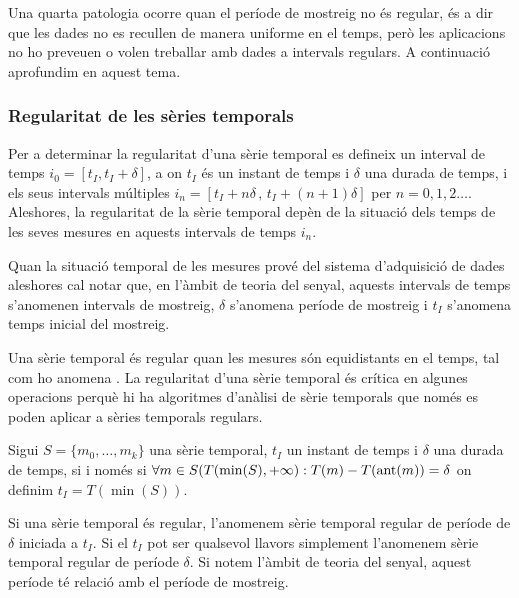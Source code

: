 Una quarta patologia ocorre quan el període de mostreig no és regular,
és a dir que les dades no es recullen de manera uniforme en el temps,
però les aplicacions no ho preveuen o volen treballar amb dades a
intervals regulars. A continuació aprofundim en aquest tema.






\subsubsection{Regularitat de les sèries temporals} 
\label{sec:sgst:regularitat}


Per a determinar la regularitat d'una sèrie temporal es defineix un
interval de temps $i_0=[t_I,t_I+\delta]$, a on $t_I$ és un instant de
temps i $\delta$ una durada de temps, i els seus intervals múltiples
$i_n=[t_I+n\delta\, ,\, t_I+(n+1)\delta]$ per
$n=0,1,2\ldots$. Aleshores, la regularitat de la sèrie temporal depèn
de la situació dels temps de les seves mesures en aquests intervals de
temps $i_n$.
 
Quan la situació temporal de les mesures prové del sistema
d'adquisició de dades aleshores cal notar que, en l'àmbit de
teoria del senyal, aquests intervals de temps s'anomenen intervals de
mostreig, $\delta$ s'anomena període de mostreig i $t_I$ s'anomena
temps inicial del mostreig.


Una sèrie temporal és regular quan les mesures són equidistants en el
temps, tal com ho anomena \textcite{last:hetland}.  La regularitat
d'una sèrie temporal és crítica en algunes operacions perquè hi ha
algoritmes d'anàlisi de sèrie temporals que només es poden aplicar a
sèries temporals regulars.
\begin{definition}
  \label{def:st:regular}
  Sigui $S=\{m_0,\ldots,m_k\}$ una sèrie temporal, $t_I$ un instant de
  temps i $\delta$ una durada de temps,
   si i només si $\forall
  m \in S(T(\min(S),+\infty):T(m) - T(\operatorname*{ant}(m)) = \delta$ on definim
  $t_I=T(\min(S))$.
\end{definition}

Si una sèrie temporal és regular, l'anomenem sèrie temporal regular de
període de $\delta$ iniciada a $t_I$. Si el $t_I$ pot ser qualsevol
llavors simplement l'anomenem sèrie temporal regular de període
$\delta$.  Si notem l'àmbit de teoria del senyal, aquest període té
relació amb el període de mostreig.


